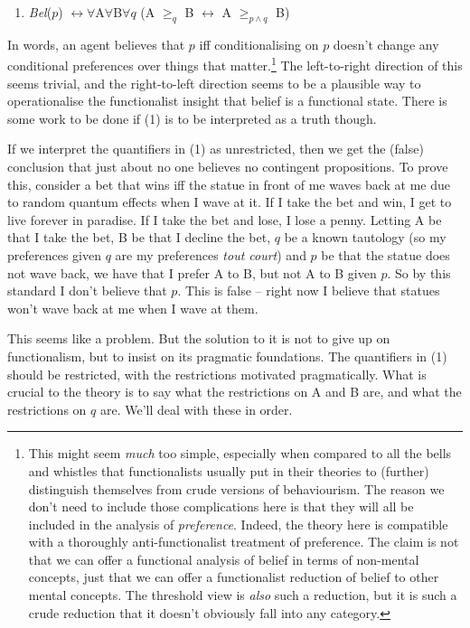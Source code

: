 \begin{enumerate}
\item \textit{Bel}(\(p\)) \(\leftrightarrow \forall\)A\(\forall\)B\(\forall q\) (A \(\geq _q\) B \(\leftrightarrow\) A \(\geq _{p \wedge q}\) B)
\end{enumerate}

\noindent In words, an agent believes that \(p\) iff conditionalising on \(p\) doesn't change any conditional preferences over things that matter.\footnote{This might seem \textit{much} too simple, especially when compared to all the bells and whistles that functionalists usually put in their theories to (further) distinguish themselves from crude versions of behaviourism. The reason we don't need to include those complications here is that they will all be included in the analysis of \textit{preference}. Indeed, the theory here is compatible with a thoroughly anti\nobreakdash-functionalist treatment of preference. The claim is not that we can offer a functional analysis of belief in terms of non-mental concepts, just that we can offer a functionalist reduction of belief to other mental concepts. The threshold view is \textit{also} such a reduction, but it is such a crude reduction that it doesn't obviously fall into any category.} The left-to-right direction of this seems trivial, and the right\nobreakdash-to\nobreakdash-left direction seems to be a plausible way to operationalise the functionalist insight that belief is a functional state. There is some work to be done if (1) is to be interpreted as a truth though.

If we interpret the quantifiers in (1) as unrestricted, then we get the (false) conclusion that just about no one believes no contingent propositions. To prove this, consider a bet that wins iff the statue in front of me waves back at me due to random quantum effects when I wave at it. If I take the bet and win, I get to live forever in paradise. If I take the bet and lose, I lose a penny. Letting A be that I take the bet, B be that I decline the bet, \(q\) be a known tautology (so my preferences given \(q\) are my preferences \textit{tout court}) and \(p\) be that the statue does not wave back, we have that I prefer A to B, but not A to B given \(p\). So by this standard I don't believe that \(p\). This is false -- right now I believe that statues won't wave back at me when I wave at them.

This seems like a problem. But the solution to it is not to give up on functionalism, but to insist on its pragmatic foundations. The quantifiers in (1) should be restricted, with the restrictions motivated pragmatically. What is crucial to the theory is to say what the restrictions on A and B are, and what the restrictions on \(q\) are. We'll deal with these in order.

